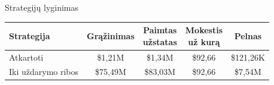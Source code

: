 \documentclass[12pt]{beamer}
\begin{document}
\begin{frame}{Strategijų lyginimas}

	\begin{table}[h!]
        \centering
        \footnotesize
        \begin{tabular}{|l|c|c|c|c|}
        \hline
        \textbf{Strategija}                & \textbf{Grąžinimas}    & \makecell{\textbf{Paimtas}\\ \textbf{užstatas}}   & \makecell{\textbf{Mokestis}\\ \textbf{už kurą}}           & \textbf{Pelnas}              \\ \hline
        Atkartoti                         & \$1,21M         & \$1,34M                & \$92,66            & \$121,26K                    \\ \hline
        Iki uždarymo ribos                   & \$75,49M       & \$83,03M            &\$92,66            & \$7,54M                      \\ \hline

\end{tabular}
\end{table}
\end{frame}
\end{document}
